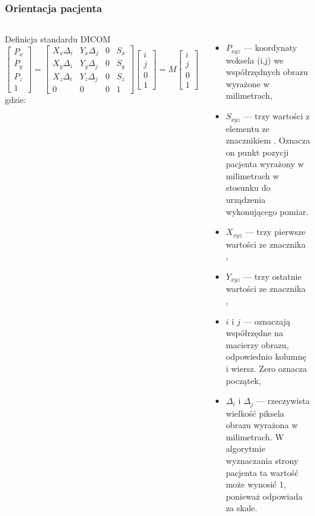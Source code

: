 \documentclass[aspectratio=169]{beamer}
\begin{document}
\begin{frame}[t]
    \frametitle{Orientacja pacjenta}
    \begin{columns}[t]

        Definicja standardu DICOM
        \tiny
        \[
            \begin{bmatrix}
                P_x \\ P_y \\ P_z \\ 1
            \end{bmatrix}
            =
            \begin{bmatrix}
                X_x\Delta_i & Y_x\Delta_j & 0 & S_x \\
                X_y\Delta_i & Y_y\Delta_j & 0 & S_y \\
                X_z\Delta_i & Y_z\Delta_j & 0 & S_z \\
                0           & 0           & 0 & 1
            \end{bmatrix}
            \begin{bmatrix}
                i \\ j \\ 0 \\ 1
            \end{bmatrix}
            =
            M
            \begin{bmatrix}
                i \\ j \\ 0 \\ 1
            \end{bmatrix}
        \]
        gdzie:
        \begin{itemize}
            \item $P_{xyz}$ --- koordynaty woksela (i,j) we współrzędnych obrazu wyrażone w milimetrach,
            \item $S_{xyz}$ --- trzy wartości z elementu ze znacznikiem . Oznacza on punkt pozycji pacjenta wyrażony w milimetrach w stosunku do urządzenia wykonującego pomiar.
            \item $X_{xyz}$ --- trzy pierwsze wartości ze znacznika ,
            \item $Y_{xyz}$ --- trzy ostatnie wartości ze znacznika ,
            \item $i$ i $j$ --- oznaczają współrzędne na macierzy obrazu, odpowiednio kolumnę i wiersz. Zero oznacza początek,
            \item $\Delta_i$ i $\Delta_j$ --- rzeczywista wielkość piksela obrazu wyrażona w milimetrach.
                  W algorytmie wyznaczania strony pacjenta ta wartość może wynosić 1, ponieważ odpowiada za skale.
        \end{itemize}


\end{columns}
\end{frame}
\end{document}
